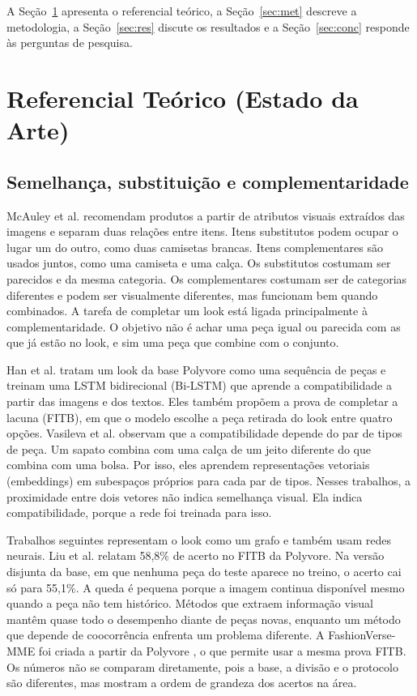 \documentclass[conference]{IEEEtran}
\begin{document}
A Seção~\ref{sec:ref} apresenta o referencial teórico, a Seção~\ref{sec:met} descreve a metodologia, a Seção~\ref{sec:res} discute os resultados e a Seção~\ref{sec:conc} responde às perguntas de pesquisa.

\section{Referencial Teórico (Estado da Arte)}
\label{sec:ref}
\subsection{Semelhança, substituição e complementaridade}

McAuley et al. \cite{mcauley2015} recomendam produtos a partir de atributos visuais extraídos das imagens e separam duas relações entre itens. Itens substitutos podem ocupar o lugar um do outro, como duas camisetas brancas. Itens complementares são usados juntos, como uma camiseta e uma calça. Os substitutos costumam ser parecidos e da mesma categoria. Os complementares costumam ser de categorias diferentes e podem ser visualmente diferentes, mas funcionam bem quando combinados. A tarefa de completar um look está ligada principalmente à complementaridade. O objetivo não é achar uma peça igual ou parecida com as que já estão no look, e sim uma peça que combine com o conjunto.

Han et al. \cite{han2017} tratam um look da base Polyvore como uma sequência de peças e treinam uma LSTM bidirecional (Bi-LSTM) que aprende a compatibilidade a partir das imagens e dos textos. Eles também propõem a prova de completar a lacuna (FITB), em que o modelo escolhe a peça retirada do look entre quatro opções. Vasileva et al. \cite{vasileva2018} observam que a compatibilidade depende do par de tipos de peça. Um sapato combina com uma calça de um jeito diferente do que combina com uma bolsa. Por isso, eles aprendem representações vetoriais (embeddings) em subespaços próprios para cada par de tipos. Nesses trabalhos, a proximidade entre dois vetores não indica semelhança visual. Ela indica compatibilidade, porque a rede foi treinada para isso.

Trabalhos seguintes representam o look como um grafo e também usam redes neurais. Liu et al. \cite{liu2020} relatam 58,8\% de acerto no FITB da Polyvore. Na versão disjunta da base, em que nenhuma peça do teste aparece no treino, o acerto cai só para 55,1\%. A queda é pequena porque a imagem continua disponível mesmo quando a peça não tem histórico. Métodos que extraem informação visual mantêm quase todo o desempenho diante de peças novas, enquanto um método que depende de coocorrência enfrenta um problema diferente. A FashionVerse-MME foi criada a partir da Polyvore \cite{fashionverse}, o que permite usar a mesma prova FITB. Os números não se comparam diretamente, pois a base, a divisão e o protocolo são diferentes, mas mostram a ordem de grandeza dos acertos na área.
\end{document}
